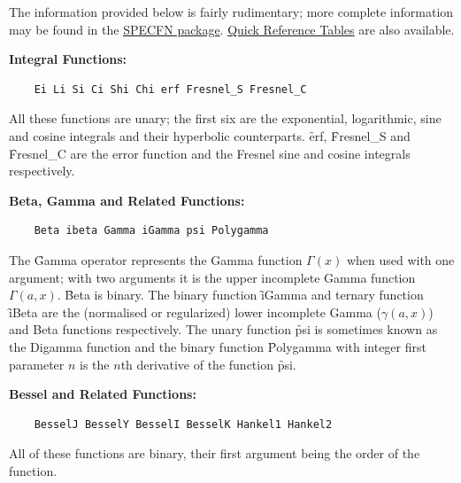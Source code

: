 The information provided below is fairly rudimentary; more complete
information may be found in the \hyperlink{SPECFNS}{SPECFN package}.
\hyperlink{SPECFNTAB1}{Quick Reference Tables} are also available.

\textbf{Integral Functions:}
\begin{verbatim}
    Ei Li Si Ci Shi Chi erf Fresnel_S Fresnel_C
\end{verbatim}
All these functions are unary;
the first six are the exponential, logarithmic, sine and
cosine integrals and their hyperbolic counterparts. \f{erf},
\f{Fresnel\_S} and \f{Fresnel\_C} are the error function and the Fresnel
sine and cosine integrals respectively.

\textbf{Beta, Gamma and Related Functions:}
\begin{verbatim}
    Beta ibeta Gamma iGamma psi Polygamma
\end{verbatim}
The \f{Gamma} operator represents the Gamma function $\Gamma(x)$ when used with one argument;
with two arguments it is the upper incomplete Gamma function $\Gamma(a,x)$.
\f{Beta} is binary.
The binary function \f{iGamma} and ternary function \f{iBeta} are the
(normalised or regularized) lower incomplete Gamma ($\gamma(a,x)$)
and Beta functions respectively.
The unary function \f{psi} is sometimes known as the Digamma function and
the binary function \f{Polygamma} with integer first parameter $n$ is the
$n$th derivative of the function \f{psi}.

\textbf{Bessel and Related Functions:}
\begin{verbatim}
    BesselJ BesselY BesselI BesselK Hankel1 Hankel2
\end{verbatim}
All of these functions are binary, their first argument being the
order of the function.

